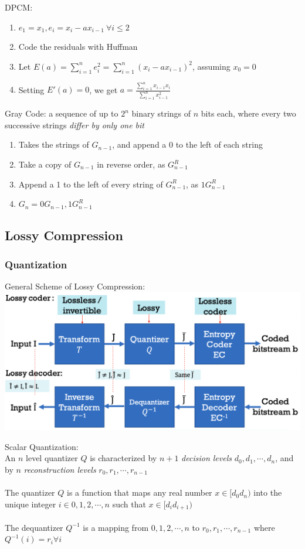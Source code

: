 DPCM:
\begin{enumerate}
    \item $e_1=x_1,e_i=x_i-ax_{i-1}\ \forall i\le2$
    \item Code the residuals with Huffman
    \item Let $E(a)=\sum^n_{i=1}e_i^2=\sum^n_{i=1}(x_i-ax_{i-1})^2$, assuming $x_0=0$
    \item Setting $E'(a)=0$, we get $a=\frac{\sum^n_{i=1}x_{i-1}x_i}{\sum^n_{i=1}x^2_{i-1}}$
\end{enumerate}

Gray Code: a sequence of up to $2^n$ binary strings of $n$ bits each, where 
every two successive strings \emph{differ by only one bit}
\begin{enumerate}
    \item Takes the strings of $G_{n-1}$, and append a 0 to the left of each string
    \item Take a copy of $G_{n-1}$ in reverse order, as $G^R_{n-1}$
    \item Append a 1 to the left of every string of $G^R_{n-1}$, as $1G^R_{n-1}$ 
    \item $G_n=0G_{n-1},1G^R_{n-1}$
\end{enumerate}

\subsection*{Lossy Compression}
\subsubsection*{Quantization}
General Scheme of Lossy Compression:\\
\includegraphics[width=\columnwidth]{General Scheme of Lossy Compression.png}

Scalar Quantization:\\
An $n$ level quantizer $Q$ is characterized by $n+1$
\emph{decision levels} $d_0,d_1,\cdots,d_n$, and by $n$ \emph{reconstruction levels}
$r_0,r_1,\cdots,r_{n-1}$\\\\
The quantizer $Q$ is a function that maps any real number $x\in [d_0 d_n)$ into
the unique integer $i\in {0,1,2,\cdots,n}$ such that $x\in [d_i d_{i+1})$\\\\
The dequantizer $Q^{-1}$ is a mapping from ${0,1,2,\cdots,n}$ to ${r_0,r_1,\cdots,r_{n-1}}$ where
$Q^{-1}(i)=r_i\forall i$\\

